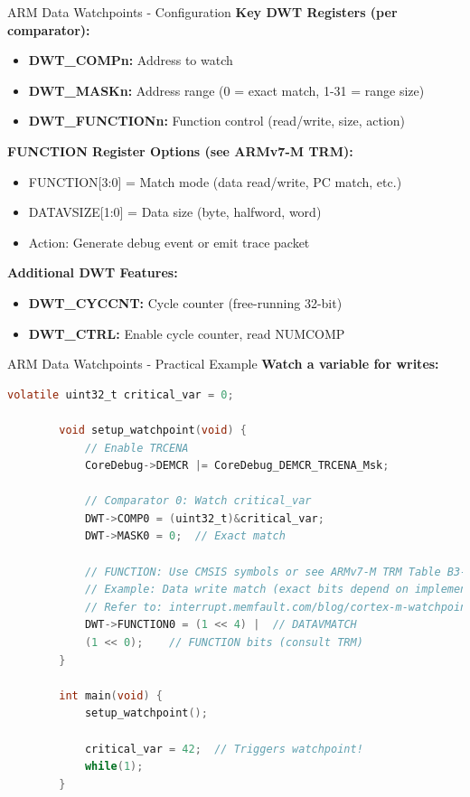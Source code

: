 \documentclass{beamer}
\begin{document}
\begin{frame}{ARM}
	{Data Watchpoints - Configuration}
	\textbf{Key DWT Registers (per comparator):}
	\begin{itemize}
		\item \textbf{DWT\_COMPn:} Address to watch
		\item \textbf{DWT\_MASKn:} Address range (0 = exact match, 1-31 = range size)
		\item \textbf{DWT\_FUNCTIONn:} Function control (read/write, size, action)
	\end{itemize}
	\vspace{0.2cm}
	\textbf{FUNCTION Register Options (see ARMv7-M TRM):}
	\begin{itemize}
		\item FUNCTION[3:0] = Match mode (data read/write, PC match, etc.)
		\item DATAVSIZE[1:0] = Data size (byte, halfword, word)
		\item Action: Generate debug event or emit trace packet
	\end{itemize}
	\vspace{0.2cm}
	\textbf{Additional DWT Features:}
	\begin{itemize}
		\item \textbf{DWT\_CYCCNT:} Cycle counter (free-running 32-bit)
		\item \textbf{DWT\_CTRL:} Enable cycle counter, read NUMCOMP
	\end{itemize}
\end{frame}

\begin{frame}[fragile]{ARM}
	{Data Watchpoints - Practical Example}
	\textbf{Watch a variable for writes:}
	\begin{lstlisting}[language=C, basicstyle=\ttfamily\tiny]
		volatile uint32_t critical_var = 0;
		
		void setup_watchpoint(void) {
			// Enable TRCENA
			CoreDebug->DEMCR |= CoreDebug_DEMCR_TRCENA_Msk;
			
			// Comparator 0: Watch critical_var
			DWT->COMP0 = (uint32_t)&critical_var;
			DWT->MASK0 = 0;  // Exact match
			
			// FUNCTION: Use CMSIS symbols or see ARMv7-M TRM Table B3-11
			// Example: Data write match (exact bits depend on implementation)
			// Refer to: interrupt.memfault.com/blog/cortex-m-watchpoints
			DWT->FUNCTION0 = (1 << 4) |  // DATAVMATCH
			(1 << 0);    // FUNCTION bits (consult TRM)
		}
		
		int main(void) {
			setup_watchpoint();
			
			critical_var = 42;  // Triggers watchpoint!
			while(1);
		}
	\end{lstlisting}
\end{frame}
\end{document}
